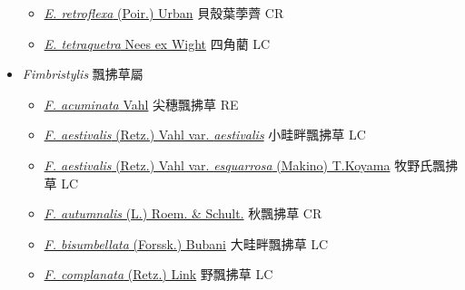 \begin{itemize}
\begin{itemize}
        \item[] \href{http://www.theplantlist.org/tpl1.1/search?q=Eleocharis+retroflexa}{\textit{E. retroflexa} (Poir.) Urban}   貝殼葉荸薺   CR
        \item[] \href{http://www.theplantlist.org/tpl1.1/search?q=Eleocharis+tetraquetra}{\textit{E. tetraquetra} Nees ex Wight}   四角藺   LC
  \end{itemize}
 \item[] \textit{Fimbristylis} 飄拂草屬
                                
  \begin{itemize}
        \item[] \href{http://www.theplantlist.org/tpl1.1/search?q=Fimbristylis+acuminata}{\textit{F. acuminata} Vahl}   尖穗飄拂草   RE
        \item[] \href{http://www.theplantlist.org/tpl1.1/search?q=Fimbristylis+aestivalis+var.+aestivalis}{\textit{F. aestivalis} (Retz.) Vahl var. \textit{aestivalis}}   小畦畔飄拂草   LC
        \item[] \href{http://www.theplantlist.org/tpl1.1/search?q=Fimbristylis+aestivalis+var.+esquarrosa}{\textit{F. aestivalis} (Retz.) Vahl var. \textit{esquarrosa} (Makino) T.Koyama}   牧野氏飄拂草   LC
        \item[] \href{http://www.theplantlist.org/tpl1.1/search?q=Fimbristylis+autumnalis}{\textit{F. autumnalis} (L.) Roem. \& Schult.}   秋飄拂草   CR
        \item[] \href{http://www.theplantlist.org/tpl1.1/search?q=Fimbristylis+bisumbellata}{\textit{F. bisumbellata} (Forssk.) Bubani}   大畦畔飄拂草   LC
        \item[] \href{http://www.theplantlist.org/tpl1.1/search?q=Fimbristylis+complanata}{\textit{F. complanata} (Retz.) Link}   野飄拂草   LC

\end{itemize}
\end{itemize}
